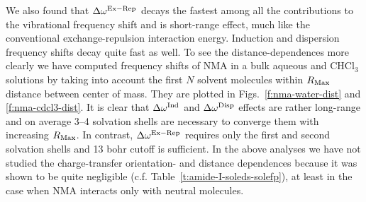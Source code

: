 \documentclass[a4paper,titlepage,twoside,fleqn,12pt]{book}
\begin{document}
\begin{refsection}
We also found that $\Delta\omega^{\rm Ex-Rep}$
decays the fastest among all the contributions to the vibrational frequency shift
and is short\hyp{}range effect, much like the conventional exchange\hyp{}repulsion interaction energy.
Induction and dispersion frequency shifts decay quite fast as well. To see the
distance\hyp{}dependences more clearly we have computed frequency shifts
of NMA in a bulk aqueous and CHCl$_3$ solutions by taking into account
the first $N$ solvent molecules within $R_{\rm Max}$ distance between center of
mass. They are plotted in Figs.~\ref{f:nma-water-dist} and \ref{f:nma-cdcl3-dist}. 
It is clear that $\Delta\omega^{\rm Ind}$
and $\Delta\omega^{\rm Disp}$ effects are rather long\hyp{}range
and on average 3--4 solvation shells are necessary to converge them with increasing $R_{\rm Max}$.
In contrast, $\Delta\omega^{\rm Ex-Rep}$ requires only the first and second solvation
shells and 13 bohr cutoff is sufficient. In the above analyses we have not studied
the charge\hyp{}transfer orientation\hyp{} and distance dependences
because it was shown to be quite negligible (c.f.
Table~\ref{t:amide-I-soleds-solefp}), at least in the case when
NMA interacts only with neutral molecules.

%


\end{refsection}
\end{document}
